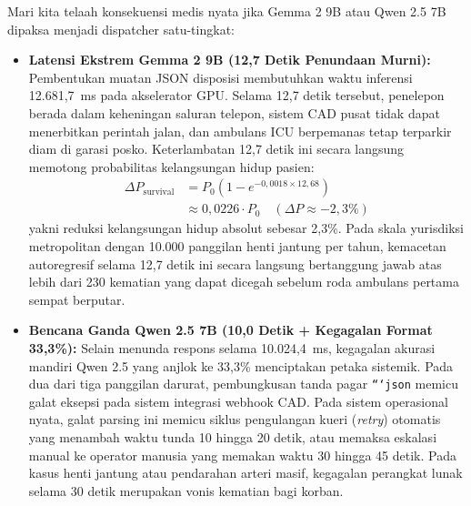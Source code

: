 \documentclass[journal,compsoc]{IEEEtran}
\begin{document}
Mari kita telaah konsekuensi medis nyata jika Gemma 2 9B atau Qwen 2.5 7B dipaksa menjadi dispatcher satu-tingkat:
\begin{itemize}
    \item \textbf{Latensi Ekstrem Gemma 2 9B (12,7 Detik Penundaan Murni):} Pembentukan muatan JSON disposisi membutuhkan waktu inferensi 12.681,7~ms pada akselerator GPU. Selama 12,7 detik tersebut, penelepon berada dalam keheningan saluran telepon, sistem CAD pusat tidak dapat menerbitkan perintah jalan, dan ambulans ICU berpemanas tetap terparkir diam di garasi posko. Keterlambatan 12,7 detik ini secara langsung memotong probabilitas kelangsungan hidup pasien:
    \begin{equation}
    \begin{aligned}
    \Delta P_{\text{survival}} &= P_0 \left(1 - e^{-0{,}0018 \times 12{,}68}\right) \\
    &\approx 0{,}0226 \cdot P_0 \quad (\Delta P \approx -2{,}3\%)
    \end{aligned}
    \end{equation}
    yakni reduksi kelangsungan hidup absolut sebesar 2,3\%. Pada skala yurisdiksi metropolitan dengan 10.000 panggilan henti jantung per tahun, kemacetan autoregresif selama 12,7 detik ini secara langsung bertanggung jawab atas lebih dari 230 kematian yang dapat dicegah sebelum roda ambulans pertama sempat berputar.
    \item \textbf{Bencana Ganda Qwen 2.5 7B (10,0 Detik + Kegagalan Format 33,3\%):} Selain menunda respons selama 10.024,4~ms, kegagalan akurasi mandiri Qwen 2.5 yang anjlok ke 33,3\% menciptakan petaka sistemik. Pada dua dari tiga panggilan darurat, pembungkusan tanda pagar \texttt{```json} memicu galat eksepsi pada sistem integrasi webhook CAD. Pada sistem operasional nyata, galat parsing ini memicu siklus pengulangan kueri (\textit{retry}) otomatis yang menambah waktu tunda 10 hingga 20 detik, atau memaksa eskalasi manual ke operator manusia yang memakan waktu 30 hingga 45 detik. Pada kasus henti jantung atau pendarahan arteri masif, kegagalan perangkat lunak selama 30 detik merupakan vonis kematian bagi korban.
\end{itemize}
\end{document}
